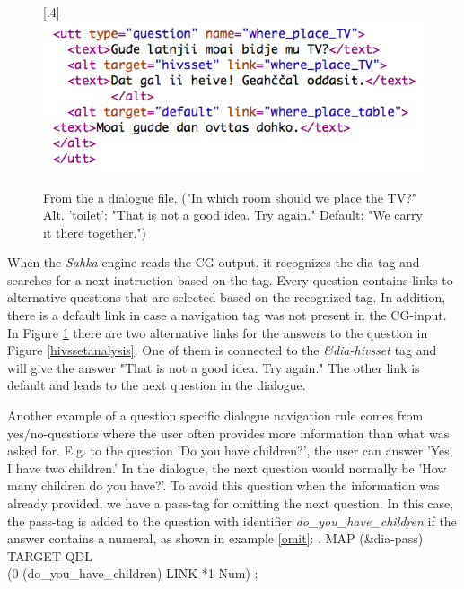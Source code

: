 \documentclass[11pt]{article}
\begin{document}
\begin{figure}[htbp]
\begin{center}
\scalebox{.4}[.4]{\includegraphics{presentation/img/whereTV.png}}\\
\caption{From the a dialogue file. ("In which room should we place the TV?" Alt. 'toilet': "That is not a good idea. Try again." Default: "We carry it there together.") 
}
\label{altlinks}
\end{center}
\end{figure}

When the \textit{Sahka}-engine reads the CG-output, it recognizes the dia-tag and searches for a next instruction based on the tag.  Every question contains links to alternative questions that are selected based on the recognized tag. In addition, there is a default link in case a navigation tag was not present in the CG-input. In Figure \ref{altlinks} there are two alternative links for the answers to the question in Figure \ref{hivssetanalysis}. One of them is connected to the \textit{\&dia-hivsset} tag and will give the answer "That is not a good idea. Try again." The other link is default and leads to the next question in the dialogue. 

Another example of a question specific dialogue navigation rule comes from yes/no-questions where the user often provides more information than what was asked for. E.g. to the question 'Do you have children?', the user can answer 'Yes, I have two children.' In the dialogue, the next question would normally be 'How many children do you have?'. To avoid this question when the information was already provided, we have a pass-tag for omitting the next question. In this case, the pass-tag is added to the question with identifier \textit{do\_you\_have\_children} if the answer contains a numeral, as shown in example \ref{omit}:
\ex.\label{omit} \small MAP (\&dia-pass) TARGET QDL \\ (0 (do\_you\_have\_children) LINK *1 Num) ;


\end{document}
